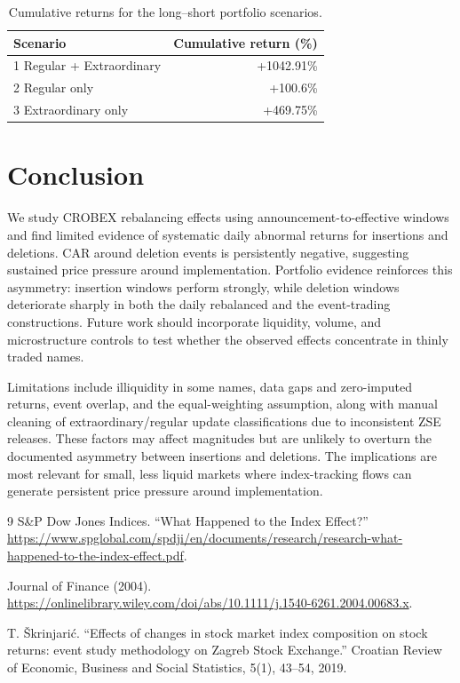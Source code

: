 \documentclass{article}
\begin{document}
\begin{table}[htbp]
\centering
\caption{Cumulative returns for the long–short portfolio scenarios.}
\label{tab:longshort_returns}
\begin{tabular}{lr}
\toprule
Scenario & Cumulative return (\%) \\
\midrule
1 Regular + Extraordinary & +1042.91\% \\
2 Regular only & +100.6\% \\
3 Extraordinary only & +469.75\% \\
\bottomrule
\end{tabular}
\end{table}







\FloatBarrier
\section{Conclusion}
We study CROBEX rebalancing effects using announcement-to-effective windows and find limited evidence of systematic daily abnormal returns for insertions and deletions. CAR around deletion events is persistently negative, suggesting sustained price pressure around implementation. Portfolio evidence reinforces this asymmetry: insertion windows perform strongly, while deletion windows deteriorate sharply in both the daily rebalanced and the event-trading constructions. Future work should incorporate liquidity, volume, and microstructure controls to test whether the observed effects concentrate in thinly traded names.

Limitations include illiquidity in some names, data gaps and zero-imputed returns, event overlap, and the equal-weighting assumption, along with manual cleaning of extraordinary/regular update classifications due to inconsistent ZSE releases. These factors may affect magnitudes but are unlikely to overturn the documented asymmetry between insertions and deletions. The implications are most relevant for small, less liquid markets where index-tracking flows can generate persistent price pressure around implementation.

\appendix

\begin{thebibliography}{9}
S\&P Dow Jones Indices.
``What Happened to the Index Effect?''
\url{https://www.spglobal.com/spdji/en/documents/research/research-what-happened-to-the-index-effect.pdf}.

Journal of Finance (2004).
\url{https://onlinelibrary.wiley.com/doi/abs/10.1111/j.1540-6261.2004.00683.x}.

T. \v{S}krinjari\'c.
``Effects of changes in stock market index composition on stock returns: event study methodology on Zagreb Stock Exchange.''
Croatian Review of Economic, Business and Social Statistics, 5(1), 43--54, 2019.
\end{thebibliography}
\end{document}
